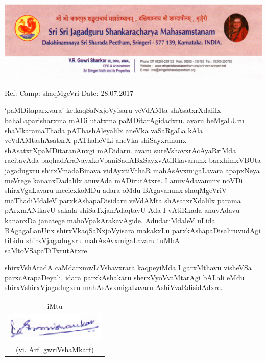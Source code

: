 \thispagestyle{empty}
\begin{center}
\includegraphics{figures/letterhead.eps}
\end{center}

\noindent
{\rm Ref:}\hfill
{\rm Camp:} shaqMgeVri\hfill
{\rm Date: 28.07.2017}
\bigskip

\noindent
`paMDitaparxvara' ke.kaqSaNxjoVyisaru veVdAMta shAsatxrXdalilx bahaLa\break parisharxma mADi utatxma paMDitarAgidadxru. avaru beMgaLUru shaMkaramaThada pAThashAleyalilx aneVka vaSaRgaLa kAla veVdAMtashAsatxrX pAThaheVLi aneVka shiSayxranunx shAsatxrXpaMDita\-ranAnxgi mADidaru. avaru sureVshavxrAcAyaRriMda racitavAda baqhadAraNayx\-koVpaniSadABxSayx\break vAtiRkavanunx barxhimxVBUta jagadugxru shirxVmadaBinava vidAyxtiVthaR mahAsAvxmigaLavara apapxNeya meVrege kananxDadalilx anuvAda mADirutAtxre. I anuvAdavanunx noVDi shirxVgaLavaru mecicxkoMDu adara oMdu BAgavanunx shaqMgeVriV maThadiMdaleV parxkAshapaDisidaru.\break veVdAMta shAsatxrXdalilx parama pArxmANikavU sakala shiSaTxjanAdaqtavU Ada I vAtiRkada anuvAdavu kananxDa janatege mahoVpakArakavAgide. AdudariMdaleV uLida BAgagaLanUnx shirxVkaqSaNx\-joVyisara makakxLu parxkAshapaDisaliruvudAgi tiLidu shirxVjagadugxru mahAsAvxmigaLavaru tuMbA saMtoVSapaTiTxrutAtxre.
\medskip

\noindent
shirxVshAradA caMdarxmwLiVshavxrara kaqpeyiMda I garxMthavu visheVSa parxcArapaDeyali, idara parxkAshakaru sherxVyoVvaMtarAgi bALali eMdu shirxVshirxVjagadugxru mahAsAvxmigaLavaru AshiVvaRdisidAdxre. 

\begin{flushright}
\begin{tabular}{c}
iMtu \\
\includegraphics{figures/signature.eps}\\
(vi. Arf. gwriVshaMkarf)
\end{tabular}
\end{flushright}
